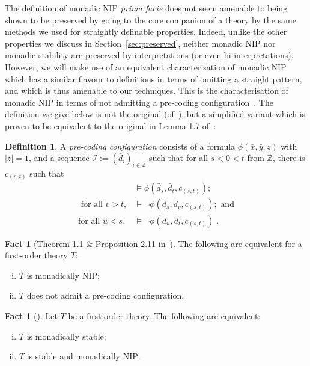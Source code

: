 \documentclass{amsart}
\theoremstyle{definition}
\newtheorem{definition}[theorem]{Definition}
\newtheorem{fact}[theorem]{Fact}
\theoremstyle{remark}
\numberwithin{equation}{section}
\begin{document}
The definition of monadic $\mathrm{NIP}$  \textit{prima facie} does not seem amenable to being shown to be preserved by going to the core companion  of a theory by the same methods we used for straightly definable properties. Indeed, unlike the other properties we discuss in Section~\ref{sec:preserved}, neither monadic $\mathrm{NIP}$ nor monadic stability are preserved by interpretations (or even bi-interpretations). However, we will make use of an equivalent characterisation of monadic $\mathrm{NIP}$ which has a similar flavour to definitions in terms of omitting a straight pattern, and which is thus amenable to our techniques. This is the characterisation of monadic $\mathrm{NIP}$ in terms of not admitting a pre-coding configuration~\cite{braunfeld2021characterizations}. The definition we give below is not the original (of~\cite[Definition 3.10]{braunfeld2021characterizations}), but a simplified variant which is proven to be equivalent to the original in Lemma 1.7 of~\cite{braunfeld2024corrigenda}:

\begin{definition} A \textit{pre-coding configuration} consists of a formula $\phi(\bar{x},\bar{y},z)$ %
with $|z|=1$, and a sequence $\mathcal{I}:=(\bar{d}_i)_{ i\in\mathbb{Z}}$ such that for all $s<0<t$ from $\mathbb{Z}$, there is $c_{(s,t)}$ such that
\begin{align}
   & \vDash \phi(\bar{d}_s,\bar{d}_t, c_{(s,t)});\\
    \text{ for all } v>t, & \vDash \neg\phi(\bar{d}_s, \bar{d}_v,c_{(s,t)}); \text{ and}\\
    \text{for all } u<s, & \vDash\neg\phi(\bar{d}_u, \bar{d}_t, c_{(s,t)})\;.
\end{align}
\end{definition}

\begin{fact}[Theorem 1.1 \& Proposition 2.11 in~\cite{braunfeld2021characterizations}]\label{fact:monnipequivalent} The following are equivalent for a first-order theory $T$:
\begin{enumerate}[(i)]
    \item $T$ is monadically $\mathrm{NIP}$;
    \item $T$ does not admit a pre-coding configuration.
\end{enumerate}
\end{fact}

\begin{fact}[{\cite{baldwin1985second}}]\label{fact:monadicallystable} Let $T$ be a first-order theory. The following are equivalent:
\begin{enumerate}[(i)]
    \item $T$ is monadically stable;
    \item $T$ is stable and monadically $\mathrm{NIP}$.
\end{enumerate}
\end{fact}
\end{document}
